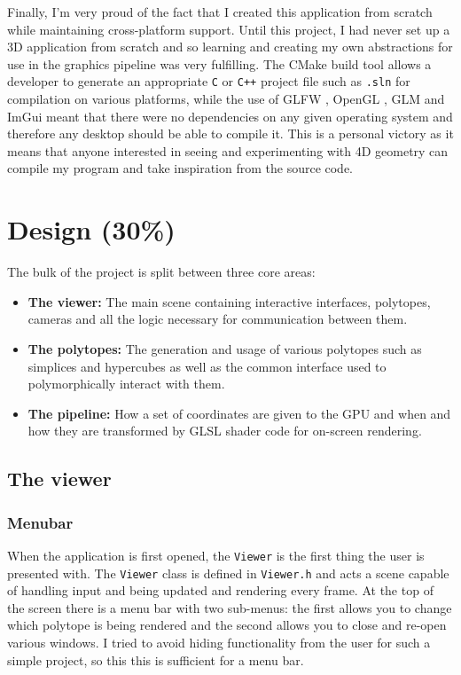 \documentclass[11pt, a4paper]{article}
\begin{document}
Finally, I'm very proud of the fact that I created this application from scratch while maintaining cross-platform support. Until this project, I had never set up a 3D application from scratch and so learning and creating my own abstractions for use in the graphics pipeline was very fulfilling. The CMake build tool \parencite{cmake} allows a developer to generate an appropriate \texttt{C} or \texttt{C++} project file such as \texttt{.sln} for compilation on various platforms, while the use of GLFW \parencite{glfw}, OpenGL \parencite{opengl}, GLM \parencite{glm} and ImGui \parencite{imgui} meant that there were no dependencies on any given operating system and therefore any desktop should be able to compile it. This is a personal victory as it means that anyone interested in seeing and experimenting with 4D geometry can compile my program and take inspiration from the source code.

\section{Design (30\%)}

The bulk of the project is split between three core areas:

\begin{itemize}
  \item \textbf{The viewer:} The main scene containing interactive interfaces, polytopes, cameras and all the logic necessary for communication between them.
  \item \textbf{The polytopes:} The generation and usage of various polytopes such as simplices and hypercubes as well as the common interface used to polymorphically interact with them.
  \item \textbf{The pipeline:} How a set of coordinates are given to the GPU and when and how they are transformed by GLSL shader code for on-screen rendering.
\end{itemize}

\subsection{The viewer}

\subsubsection{Menubar}

When the application is first opened, the \texttt{Viewer} is the first thing the user is presented with. The \texttt{Viewer} class is defined in \texttt{Viewer.h} and acts a scene capable of handling input and being updated and rendering every frame. At the top of the screen there is a menu bar with two sub-menus: the first allows you to change which polytope is being rendered and the second allows you to close and re-open various windows. I tried to avoid hiding functionality from the user for such a simple project, so this this is sufficient for a menu bar.
\end{document}
